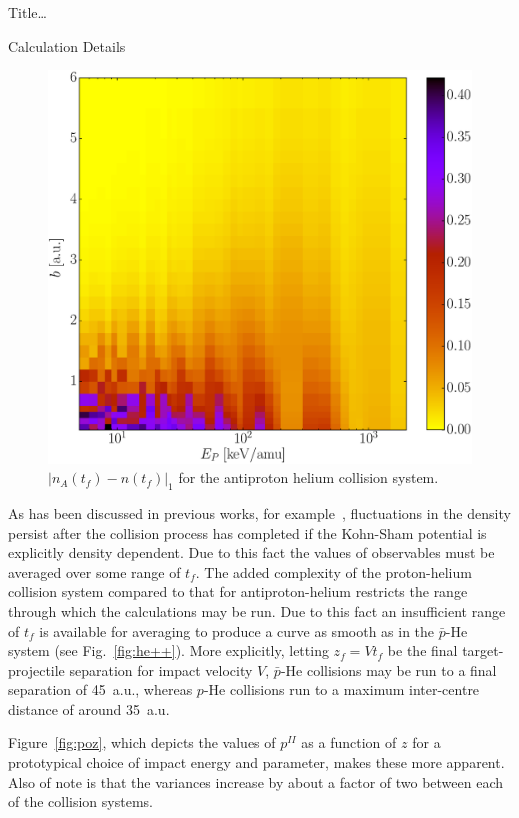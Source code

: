 \documentclass[letterpaper, 11 pt]{report}
\begin{document}
\begin{chapter}{ Title\dots \label{chap:p-he2p-he}}
\begin{section}{Calculation Details \label{sec:phe2p-det}}
\begin{figure}[ht]
\begin{minipage}{.49\linewidth}
            \centering
            \includegraphics[width = \linewidth]{./images/dendiff.eps}
            \caption[Density difference]
                   {$\left| n_A\left(t_f \right) - n\left(t_f\right)\right|_1$ for the antiproton
                    helium collision system. \label{fig:l1}}
         \end{minipage}
      \end{figure}

      As has been discussed in previous works, for example~\cite{microresp,pbarhe}, fluctuations in the
      density persist after the collision process has completed if the Kohn-Sham potential is explicitly
      density dependent. Due to this fact the values of observables must be averaged over some range of
      $t_f$. The added complexity of the proton-helium collision system compared to that for
      antiproton-helium restricts the range through which the calculations may be run. Due to this fact
      an insufficient range of $t_f$ is available for averaging to produce a curve as smooth as in the
      $\bar{p}$-He system (see Fig.~\ref{fig:he++}). More explicitly, letting $z_f = V t_f$ be the final
      target-projectile separation for impact velocity $V$, $\bar{p}$-He collisions may be run to a
      final separation of 45~a.u., whereas $p$-He collisions run to a maximum inter-centre distance of
      around 35~a.u.
      
      Figure~\ref{fig:poz}, which depicts the values of $p^{II}$ as a function of $z$ for a prototypical
      choice of impact energy and parameter, makes these more apparent. Also of note is that the
      variances increase by about a factor of two between each of the collision systems.


\end{section}
\end{chapter}
\end{document}
